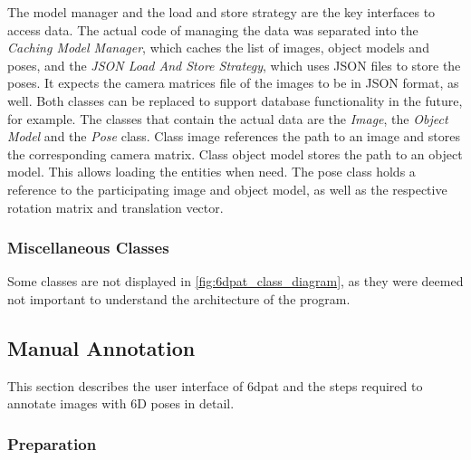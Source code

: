 The model manager and the load and store strategy are the key interfaces to access data. The actual code of managing the data was separated into the \textit{Caching Model Manager}, which caches the list of images, object models and poses, and the \textit{JSON Load And Store Strategy}, which uses JSON files to store the poses. It expects the camera matrices file of the images to be in JSON format, as well. Both classes can be replaced to support database functionality in the future, for example. The classes that contain the actual data are the \textit{Image}, the \textit{Object Model} and the \textit{Pose} class. Class image references the path to an image and stores the corresponding camera matrix. Class object model stores the path to an object model. This allows loading the entities when need. The pose class holds a reference to the participating image and object model, as well as the respective rotation matrix and translation vector. 

\subsubsection{Miscellaneous Classes}

Some classes are not displayed in \fig \ref{fig:6dpat_class_diagram}, as they were deemed not important to understand the architecture of the program.

\subsection{Manual Annotation} 

This section describes the user interface of \ac{6dpat} and the steps required to annotate images with 6D poses in detail. 

\subsubsection{Preparation}

